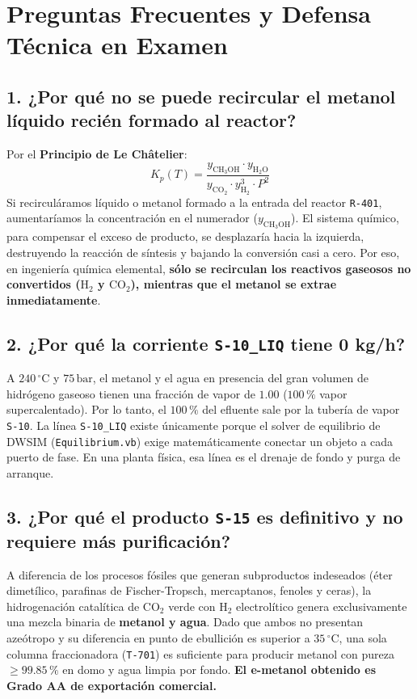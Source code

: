 \documentclass[11pt,a4paper]{article}
\begin{document}
\section{Preguntas Frecuentes y Defensa Técnica en Examen}

\subsection{1. ¿Por qué no se puede recircular el metanol líquido recién formado al reactor?}
Por el \textbf{Principio de Le Châtelier}:
\begin{equation}
    K_p(T) = \frac{y_{\text{CH}_3\text{OH}} \cdot y_{\text{H}_2\text{O}}}{y_{\text{CO}_2} \cdot y_{\text{H}_2}^3 \cdot P^2}
\end{equation}
Si recirculáramos líquido o metanol formado a la entrada del reactor \texttt{R-401}, aumentaríamos la concentración en el numerador ($y_{\text{CH}_3\text{OH}}$). El sistema químico, para compensar el exceso de producto, se desplazaría hacia la izquierda, destruyendo la reacción de síntesis y bajando la conversión casi a cero. Por eso, en ingeniería química elemental, \textbf{sólo se recirculan los reactivos gaseosos no convertidos ($\text{H}_2$ y $\text{CO}_2$), mientras que el metanol se extrae inmediatamente}.

\subsection{2. ¿Por qué la corriente \texttt{S-10\_LIQ} tiene 0 kg/h?}
A $240\,^\circ\text{C}$ y $75\,\text{bar}$, el metanol y el agua en presencia del gran volumen de hidrógeno gaseoso tienen una fracción de vapor de $1.00$ ($100\,\%$ vapor supercalentado). Por lo tanto, el $100\,\%$ del efluente sale por la tubería de vapor \texttt{S-10}. La línea \texttt{S-10\_LIQ} existe únicamente porque el solver de equilibrio de DWSIM (\texttt{Equilibrium.vb}) exige matemáticamente conectar un objeto a cada puerto de fase. En una planta física, esa línea es el drenaje de fondo y purga de arranque.

\subsection{3. ¿Por qué el producto \texttt{S-15} es definitivo y no requiere más purificación?}
A diferencia de los procesos fósiles que generan subproductos indeseados (éter dimetílico, parafinas de Fischer-Tropsch, mercaptanos, fenoles y ceras), la hidrogenación catalítica de $\text{CO}_2$ verde con $\text{H}_2$ electrolítico genera exclusivamente una mezcla binaria de \textbf{metanol y agua}. Dado que ambos no presentan azeótropo y su diferencia en punto de ebullición es superior a $35\,^\circ\text{C}$, una sola columna fraccionadora (\texttt{T-701}) es suficiente para producir metanol con pureza $\ge 99.85\,\%$ en domo y agua limpia por fondo. \textbf{El e-metanol obtenido es Grado AA de exportación comercial.}
\end{document}
